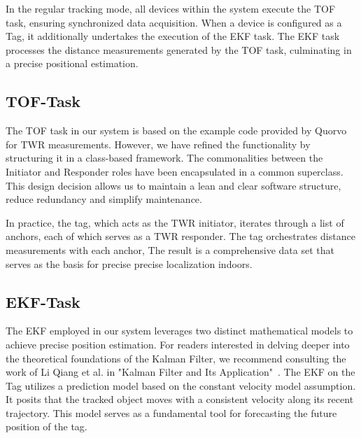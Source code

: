 \documentclass[10pt,a4paper,twocolumn]{article}
\begin{document}
In the regular tracking mode,
all devices within the system execute the TOF task, ensuring synchronized data acquisition.
When a device is configured as a Tag,
it additionally undertakes the execution of the \ac{EKF} task.
The \ac{EKF} task processes the distance measurements generated by the TOF task,
culminating in a precise positional estimation.

\subsection{TOF-Task}\label{section:firmware-tof}
The \ac{TOF} task in our system is based on the example code
provided by Quorvo for \acf{TWR} measurements.
However, we have refined the functionality by structuring it in a class-based framework.
The commonalities between the Initiator and Responder roles have been
encapsulated in a common superclass.
This design decision allows us to maintain a lean and clear software structure,
reduce redundancy and simplify maintenance.

In practice, the tag, which acts as the \ac{TWR} initiator,
iterates through a list of anchors, each of which serves as a \ac{TWR} responder.
The tag orchestrates distance measurements with each anchor,
The result is a comprehensive data set that serves as the basis for precise
precise localization indoors.

\subsection{EKF-Task}\label{section:firmware-ekf}
The \ac{EKF} employed in our system leverages two distinct mathematical models
to achieve precise position estimation.
For readers interested in delving deeper into the theoretical foundations of the
Kalman Filter, we recommend consulting the work of Li Qiang et al. in
"Kalman Filter and Its Application"~\cite{Kalman}.
The EKF  on the Tag utilizes a prediction model based on the constant velocity model assumption.
It posits that the tracked object moves with a consistent velocity along its recent
trajectory.
This model serves as a fundamental tool for forecasting the future position of the tag.
\end{document}
